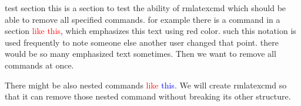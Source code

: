 \documentclass{article}
\newcommand{\CR}[1]{\textcolor{red}{#1}}
\newcommand{\CB}[1]{\textcolor{blue}{#1}}
\begin{document}
    \begin{section}{test section}
        this is a section to test the ability of rmlatexcmd which should be able to remove all specified commands. for example there is a command in a section \CR{like this}, which emphasizes this text using red color. such this notation is used frequently to note someone else another user changed that point. there would be so many emphasized text sometimes. Then we want to remove all commands at once.

        There might be also nested commands \CR{like \CB{this}}. We will create rmlatexcmd so that it can remove those nested command without breaking its other structure.
    \end{section}

    
\end{document}
